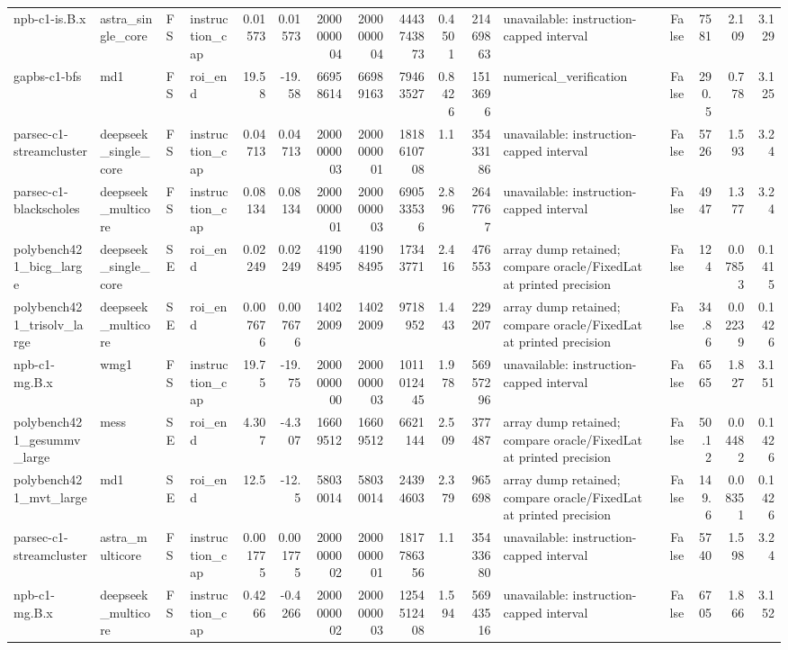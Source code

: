 \begin{tabular}{llllrrrrrrrlrrrr}
npb-c1-is.B.x & astra\_single\_core & FS & instruction\_cap & 0.01573 & 0.01573 & 2000000004 & 2000000004 & 4443743873 & 0.4501 & 21469863 & unavailable: instruction-capped interval & False & 7581 & 2.109 & 3.129 \\
gapbs-c1-bfs & md1 & FS & roi\_end & 19.58 & -19.58 & 66958614 & 66989163 & 79463527 & 0.8426 & 1513696 & numerical\_verification & False & 290.5 & 0.778 & 3.125 \\
parsec-c1-streamcluster & deepseek\_single\_core & FS & instruction\_cap & 0.04713 & 0.04713 & 2000000003 & 2000000001 & 1818610708 & 1.1 & 35433186 & unavailable: instruction-capped interval & False & 5726 & 1.593 & 3.24 \\
parsec-c1-blackscholes & deepseek\_multicore & FS & instruction\_cap & 0.08134 & 0.08134 & 2000000001 & 2000000003 & 690533536 & 2.896 & 2647767 & unavailable: instruction-capped interval & False & 4947 & 1.377 & 3.24 \\
polybench421\_bicg\_large & deepseek\_single\_core & SE & roi\_end & 0.02249 & 0.02249 & 41908495 & 41908495 & 17343771 & 2.416 & 476553 & array dump retained; compare oracle/FixedLat at printed precision & False & 124 & 0.07853 & 0.1415 \\
polybench421\_trisolv\_large & deepseek\_multicore & SE & roi\_end & 0.007676 & 0.007676 & 14022009 & 14022009 & 9718952 & 1.443 & 229207 & array dump retained; compare oracle/FixedLat at printed precision & False & 34.86 & 0.02239 & 0.1426 \\
npb-c1-mg.B.x & wmg1 & FS & instruction\_cap & 19.75 & -19.75 & 2000000000 & 2000000003 & 1011012445 & 1.978 & 56957296 & unavailable: instruction-capped interval & False & 6565 & 1.827 & 3.151 \\
polybench421\_gesummv\_large & mess & SE & roi\_end & 4.307 & -4.307 & 16609512 & 16609512 & 6621144 & 2.509 & 377487 & array dump retained; compare oracle/FixedLat at printed precision & False & 50.12 & 0.04482 & 0.1426 \\
polybench421\_mvt\_large & md1 & SE & roi\_end & 12.5 & -12.5 & 58030014 & 58030014 & 24394603 & 2.379 & 965698 & array dump retained; compare oracle/FixedLat at printed precision & False & 149.6 & 0.08351 & 0.1426 \\
parsec-c1-streamcluster & astra\_multicore & FS & instruction\_cap & 0.001775 & 0.001775 & 2000000002 & 2000000001 & 1817786356 & 1.1 & 35433680 & unavailable: instruction-capped interval & False & 5740 & 1.598 & 3.24 \\
npb-c1-mg.B.x & deepseek\_multicore & FS & instruction\_cap & 0.4266 & -0.4266 & 2000000002 & 2000000003 & 1254512408 & 1.594 & 56943516 & unavailable: instruction-capped interval & False & 6705 & 1.866 & 3.152 \\

\end{tabular}

